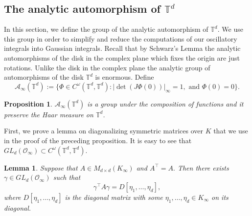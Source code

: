 \documentclass[11pt]{amsart}
\theoremstyle{plain}
\theoremstyle{plain}
\newtheorem{proposition}[theorem]{Proposition}
\newtheorem{lemma}[theorem]{Lemma}
\theoremstyle{remark}
\theoremstyle{definition}
\newcommand{\TT}{\mathbb{T}}
\newcommand{\cA}{\mathcal{A}}
\newcommand{\cO}{\mathcal{O}}
\begin{document}
\subsection{The analytic automorphism of $\TT^d$ }
In this section, we define the group of the analytic automorphism of $\TT^d.$ We use this group in order to simplify and reduce the computations of our oscillatory integrals into Gaussian integrals. Recall that by  Schwarz's Lemma the analytic automorphisms  of the disk in the complex plane  which fixes the origin are just rotations. Unlike the disk in the complex plane the analytic group of automorphisms of the disk $\TT^d$ is enormous.  Define
\[
\cA_{\infty}(\TT^d):=\big\{\Phi\in C^{\omega}(\TT^d,\TT^d): |\det (J\Phi(0)) |_{\infty}=1,  \text{ and }  \Phi(0)=0   \big\}.
\]
\begin{proposition}\label{auto}
$\cA_{\infty}(\TT^d)$ is a group under the composition of functions and it preserve the Haar measure on $\TT^d$. 
\end{proposition}
First, we prove a lemma on diagonalizing symmetric matrices over $K$ that we use in the proof of the preceding proposition.  It is easy to see that $GL_d(\cO_{\infty})\subset C^{\omega}(\TT^d,\TT^d).$
\begin{lemma}\label{diag}
Suppose that $A \in M_{d\times d}(K_{\infty})$ and $A^{\intercal}=A.$ Then there exists $\gamma\in GL_d(\cO_{\infty})$ such that 
\[
\gamma^{\intercal}A\gamma=D[\eta_1,\dots,\eta_d],
\]
where $D[\eta_1,\dots,\eta_d]$ is the diagonal matrix with some $\eta_1, \dots, \eta_d\in K_{\infty} $ on its diagonal.
\end{lemma}
\end{document}
